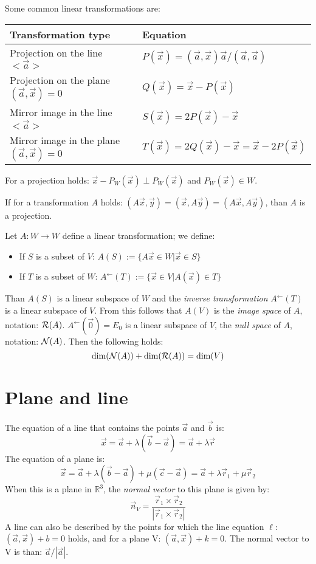 Some common linear transformations are:
\begin{center}
	\begin{tabular}{||p{7cm}|p{6cm}||}
		\hline
		\bf Transformation type&\bf Equation\\
		\hline
		\hline
		Projection on the line $<\vec{a}>$             &$P(\vec{x})=(\vec{a},\vec{x})\vec{a}/(\vec{a},\vec{a})$\\
		Projection on the plane $(\vec{a},\vec{x})=0$ &$Q(\vec{x})=\vec{x}-P(\vec{x})$\\
		Mirror image in the line $<\vec{a}>$             &$S(\vec{x})=2P(\vec{x})-\vec{x}$\\
		Mirror image in the plane $(\vec{a},\vec{x})=0$&$T(\vec{x})=2Q(\vec{x})-\vec{x}=\vec{x}-2P(\vec{x})$\\
		\hline
	\end{tabular}
\end{center}
For a projection holds: $\vec{x}-P_W(\vec{x})\perp P_W(\vec{x})$ and
$P_W(\vec{x})\in W$.

If for a transformation $A$ holds: $(A\vec{x},\vec{y})=(\vec{x},A\vec{y})=(A\vec{x},A\vec{y})$,
than $A$ is a projection.

Let $A:W\rightarrow W$ define a linear transformation; we define:
\begin{itemize}
	\item If $S$ is a subset of $V$: $A(S):=\{A\vec{x}\in W|\vec{x}\in S\}$
	\item If $T$ is a subset of $W$: $A^\leftarrow(T):=\{\vec{x}\in V|A(\vec{x})\in T\}$
\end{itemize}
Than $A(S)$ is a linear subspace of $W$ and the {\it inverse transformation}
$A^\leftarrow(T)$ is a linear subspace of $V$. From this follows that $A(V)$ is
the {\it image space} of $A$, notation: ${\cal R}(A)$. $A^\leftarrow(\vec{0})=E_0$
is a linear subspace of $V$, the {\it null space} of $A$, notation:
${\cal N}(A)$. Then the following holds:
\[
{\rm dim}({\cal N}(A))+{\rm dim}({\cal R}(A))={\rm dim}(V)
\]

\section{Plane and line}
The equation of a line that contains the points $\vec{a}$ and $\vec{b}$ is:
\[
\vec{x}=\vec{a}+\lambda(\vec{b}-\vec{a})=\vec{a}+\lambda\vec{r}
\]
The equation of a plane is:
\[
\vec{x}=\vec{a}+\lambda(\vec{b}-\vec{a})+\mu(\vec{c}-\vec{a})=\vec{a}+\lambda\vec{r}_1+\mu\vec{r}_2
\]
When this is a plane in $ \mathbb{R}^3$, the {\it normal vector} to this plane is given
by:
\[
\vec{n}_V=\frac{\vec{r}_1\times\vec{r}_2}{|\vec{r}_1\times\vec{r}_2|}
\]
A line can also be described by the points for which the line equation
$\ell$: $(\vec{a},\vec{x})+b=0$ holds, and for a plane V: $(\vec{a},\vec{x})+k=0$.
The normal vector to V is than: $\vec{a}/|\vec{a}|$.

